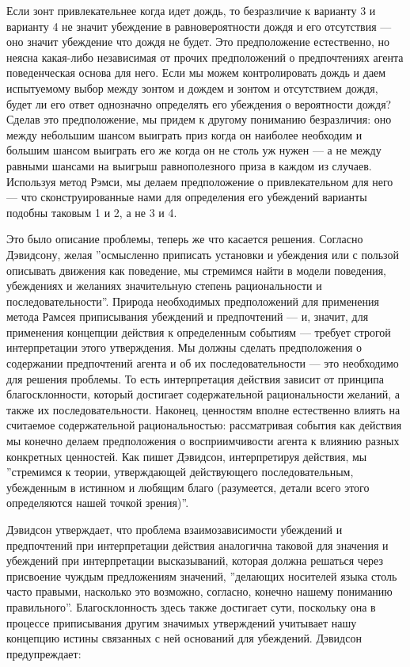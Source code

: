 \documentclass[11pt]{book}
\begin{document}
Если зонт привлекательнее когда идет дождь, то безразличие к варианту 3 и варианту 4 не значит убеждение в равновероятности дождя и его отсутствия --- оно значит убеждение что дождя не будет. Это предположение естественно, но неясна какая-либо независимая от прочих предположений о предпочтениях агента поведенческая основа для него. Если мы можем контролировать дождь и даем испытуемому выбор между зонтом и дождем и зонтом и отсутствием дождя, будет ли его ответ однозначно определять его убеждения о вероятности дождя? Сделав это предположение, мы придем к другому пониманию безразличия: оно между небольшим шансом выиграть приз когда он наиболее необходим и большим шансом выиграть его же когда он не столь уж нужен --- а не между равными шансами на выигрыш равнополезного приза в каждом из случаев. Используя метод Рэмси, мы делаем предположение о привлекательном для него --- что сконструированные нами для определения его убеждений варианты подобны таковым 1 и 2, а не 3 и 4.

Это было описание проблемы, теперь же что касается решения. Согласно Дэвидсону, желая ''осмысленно приписать установки и убеждения или с пользой описывать движения как поведение, мы стремимся найти в модели поведения, убеждениях и желаниях значительную степень рациональности и последовательности''. Природа необходимых предположений для применения метода Рамсея приписывания убеждений и предпочтений --- и, значит, для применения концепции действия к определенным событиям --- требует строгой интерпретации этого утверждения. Мы должны сделать предположения о содержании предпочтений агента и об их последовательности --- это необходимо для решения проблемы. То есть интерпретация действия зависит от принципа благосклонности, который достигает содержательной рациональности желаний, а также их последовательности. Наконец, ценностям вполне естественно влиять на считаемое содержательной рациональностью: рассматривая события как действия мы конечно делаем предположения о восприимчивости агента к влиянию разных конкретных ценностей. Как пишет Дэвидсон, интерпретируя действия, мы ''стремимся к теории, утверждающей действующего последовательным, убежденным в истинном и любящим благо (разумеется, детали всего этого определяются нашей точкой зрения)''.

Дэвидсон утверждает, что проблема взаимозависимости убеждений и предпочтений при интерпретации действия аналогична таковой для значения и убеждений при интерпретации высказываний, которая должна решаться через присвоение чуждым предложениям значений, ''делающих носителей языка столь часто правыми, насколько это возможно, согласно, конечно нашему пониманию правильного''. Благосклонность здесь также достигает сути, поскольку она в процессе приписывания другим значимых утверждений учитывает нашу концепцию истины связанных с ней оснований для убеждений. Дэвидсон предупреждает:
\end{document}
